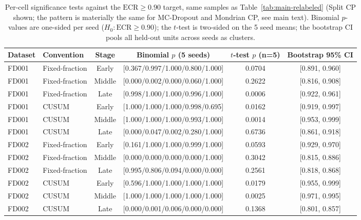 \begin{table}[t]
\caption{Per-cell significance tests against the $\mathrm{ECR}\geq 0.90$ target, same samples as Table~\ref{tab:main-relabeled} (Split CP shown; the pattern is materially the same for MC-Dropout and Mondrian CP, see main text). Binomial $p$-values are one-sided per seed ($H_0:\mathrm{ECR}\geq 0.90$); the $t$-test is two-sided on the 5 seed means; the bootstrap CI pools all held-out units across seeds as clusters.}
\label{tab:tests-relabeled}
\centering
\small
\begin{tabular}{llcccc}
\toprule
Dataset & Convention & Stage & Binomial $p$ (5 seeds) & $t$-test $p$ (n=5) & Bootstrap 95\% CI \\
\midrule
FD001 & Fixed-fraction & Early & [0.367/0.997/1.000/0.800/1.000] & 0.0704 & [0.891, 0.960] \\
FD001 & Fixed-fraction & Middle & [0.000/0.002/0.000/0.060/1.000] & 0.2622 & [0.816, 0.908] \\
FD001 & Fixed-fraction & Late & [0.998/1.000/1.000/0.996/1.000] & 0.0006 & [0.922, 0.961] \\
FD001 & CUSUM & Early & [1.000/1.000/1.000/0.998/0.695] & 0.0162 & [0.919, 0.997] \\
FD001 & CUSUM & Middle & [1.000/1.000/1.000/0.993/1.000] & 0.0014 & [0.953, 0.999] \\
FD001 & CUSUM & Late & [0.000/0.047/0.002/0.280/1.000] & 0.6736 & [0.861, 0.918] \\
FD002 & Fixed-fraction & Early & [0.161/1.000/1.000/0.999/1.000] & 0.0593 & [0.929, 0.970] \\
FD002 & Fixed-fraction & Middle & [0.000/0.000/0.000/0.000/1.000] & 0.3042 & [0.815, 0.886] \\
FD002 & Fixed-fraction & Late & [0.995/0.806/0.094/0.000/0.000] & 0.2561 & [0.818, 0.868] \\
FD002 & CUSUM & Early & [0.596/1.000/1.000/1.000/1.000] & 0.0179 & [0.955, 0.999] \\
FD002 & CUSUM & Middle & [1.000/1.000/1.000/1.000/1.000] & 0.0025 & [0.971, 0.995] \\
FD002 & CUSUM & Late & [0.000/0.001/0.006/0.000/0.000] & 0.1368 & [0.801, 0.857] \\

\end{tabular}
\end{table}
